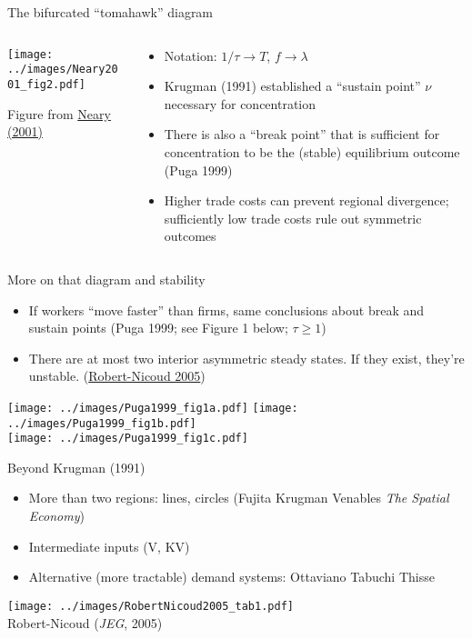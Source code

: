 \documentclass[10pt,notes=hide]{beamer}
\begin{document}
\begin{frame}{The bifurcated ``tomahawk'' diagram}
\begin{columns}
\begin{column}{.5\textwidth}
\texttt{[image: ../images/Neary2001\_fig2.pdf]}
\begin{center}
{\footnotesize Figure from \href{https://www.aeaweb.org/articles?id=10.1257/jel.39.2.536}{Neary (2001)}}
\end{center}
\end{column}
\begin{column}{.48\textwidth}
\begin{itemize}
	\item {\small Notation: $1/\tau \to T$, $f \to \lambda$}
	\item Krugman (1991) established a ``sustain point'' $\nu$ necessary for concentration
	\item There is also a ``break point'' that is sufficient for concentration to be the (stable) equilibrium outcome (Puga 1999)
	\item Higher trade costs can prevent regional divergence; sufficiently low trade costs rule out symmetric outcomes
\end{itemize}
\end{column}
\end{columns}
\end{frame}
\begin{frame}{More on that diagram and stability}
\begin{itemize}
	\item If workers ``move faster'' than firms, same conclusions about break and sustain points (Puga 1999; see Figure 1 below; $\tau \geq 1$)
	\item There are at most two interior asymmetric steady states. If they exist, they're unstable. (\href{https://ideas.repec.org/a/oup/jecgeo/v5y2005i2p201-234.html}{Robert-Nicoud 2005})
\end{itemize}
\texttt{[image: ../images/Puga1999\_fig1a.pdf]}
\texttt{[image: ../images/Puga1999\_fig1b.pdf]} \\
\texttt{[image: ../images/Puga1999\_fig1c.pdf]}
\end{frame}
\begin{frame}{Beyond Krugman (1991)}
\begin{itemize}
	\item More than two regions: lines, circles (Fujita Krugman Venables \textit{The Spatial Economy})
	\item Intermediate inputs (V, KV)
	\item Alternative (more tractable) demand systems: Ottaviano Tabuchi Thisse
\end{itemize}
\begin{center}
\texttt{[image: ../images/RobertNicoud2005\_tab1.pdf]} \\
\vspace{-2mm}
{\footnotesize Robert-Nicoud (\textit{JEG}, 2005)}
\end{center}
\end{frame}
\end{document}
